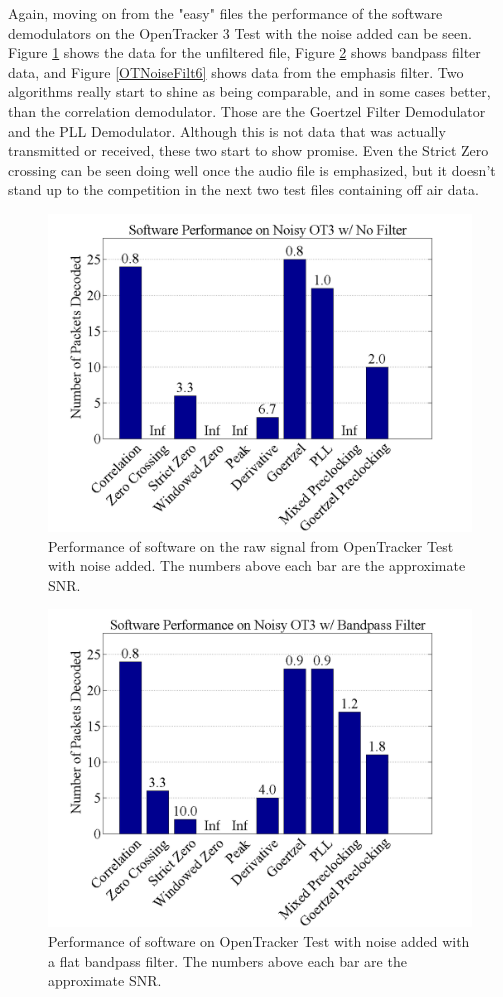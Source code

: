 Again, moving on from the "easy" files the performance of the software demodulators on the OpenTracker 3 Test with the noise added can be seen. Figure \ref{OTNoiseFiltNo} shows the data for the unfiltered file, Figure \ref{OTNoiseFilt0} shows bandpass filter data, and Figure \ref{OTNoiseFilt6} shows data from the emphasis filter. Two algorithms really start to shine as being comparable, and in some cases better, than the correlation demodulator. Those are the Goertzel Filter Demodulator and the PLL Demodulator. Although this is not data that was actually transmitted or received, these two start to show promise. Even the Strict Zero crossing can be seen doing well once the audio file is emphasized, but it doesn't stand up to the competition in the next two test files containing off air data.

\begin{figure}
  \centering
	\includegraphics[width=0.75\linewidth]{images/SoftwarePerformanceonNoisyOT3wNoFilter.png} 
	\caption{Performance of software on the raw signal from OpenTracker Test with noise added. The numbers above each bar are the approximate SNR.}
   \label{OTNoiseFiltNo}
\end{figure}
\begin{figure}
  \centering
	\includegraphics[width=0.75\linewidth]{images/SoftwarePerformanceonNoisyOT3wBandpassFilter.png} 
	\caption{Performance of software on OpenTracker Test with noise added with a flat bandpass filter. The numbers above each bar are the approximate SNR.}
   \label{OTNoiseFilt0}
\end{figure}
